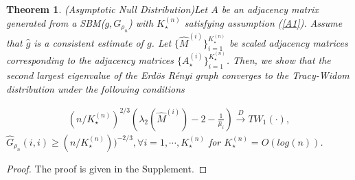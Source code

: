 \documentclass[10pt,a4paper]{amsart}
\newtheorem{theorem}{Theorem}
\newcommand{\be}{\begin{eqnarray}}
\newcommand{\ee}{\end{eqnarray}}
\begin{document}
\begin{theorem} (Asymptotic Null Distribution)\label{est.TW.thm}
Let $A$ be an adjacency matrix generated from a SBM($g, G_{\rho_n}$) with $K_{\star}^{(n)}$ satisfying assumption (\ref{A1}). Assume that $\hat{g}$ is a consistent estimate of $g$. Let $\{ \hat{M}^{(i)}\}_{i=1}^{K_{\star}^{(n)}}$ be scaled adjacency matrices corresponding to the adjacency matrices $\{ A_{\star}^{(i)} \}_{i=1}^{K_{\star}^{(n)}}$. Then, we show that the second largest eigenvalue of the Erd\"{o}s R\'{e}nyi graph converges to the Tracy-Widom distribution under the following conditions

\be\label{est.tW}
(n/K_{\star}^{(n)})^{2/3}(\lambda_2(\hat{M}^{(i)}) - 2 - \frac{1}{\hat{\mu}_i}) \xrightarrow[]{D} TW_1(\cdot),
\ee
{} $\hat{G}_{\rho_n}(i,i) \ge (n/K_{\star}^{(n)}))^{-2/3},  \forall i =1, \cdots, K_{\star}^{(n)}$
for $K_{\star}^{(n)} = O(log(n))$.
\end{theorem}

\begin{proof}
The proof is given in the Supplement.
\end{proof}
\end{document}
